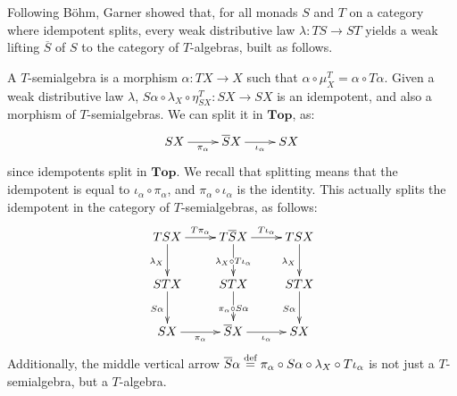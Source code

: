 \documentclass[preprint,12pt]{elsarticle}
\newcommand\eqdef{\mathrel{\buildrel \text{def}\over=}}
\newcommand{\creal}{\overline{\mathbb{R}}_+}
\newcommand\Pred{\mathbb{P}}
\newcommand\Demon{{\mathtt{D}}}
\newcommand\Nature{{\mathtt{P}}}
\newcommand\DN{{\Demon\Nature}}
\newcommand\Smyth{{\mathcal Q}}
\newcommand\Vt{\mathsf{V}}
\newcommand\SV{\Smyth_{\Vt}}
\newcommand\Val{{\mathbf V}}
\newcommand\Topcat{\mathbf{Top}}
\newtheorem{remark}[theorem]{Remark}
\begin{document}

Following B\"ohm, Garner showed that, for all monads $S$ and $T$ on a
category where idempotent splits, every weak distributive law
$\lambda \colon TS \to ST$ yields a weak lifting $\overline S$ of $S$
to the category of $T$-algebras, built as follows.

A $T$-semialgebra is a morphism $\alpha \colon TX \to X$ such that
$\alpha \circ \mu^T_X = \alpha \circ T \alpha$.  Given a weak
distributive law $\lambda$,
$S \alpha \circ \lambda_X \circ \eta^T_{SX} \colon SX \to SX$ is an
idempotent, and also a morphism of $T$-semialgebras.  We can split it
in $\Topcat$, as:
\[
  \xymatrix{
    SX \ar[r]_{\pi_\alpha}
    & \overline S X \ar[r]_{\iota_\alpha}
    & SX
  }
\]
since idempotents split in $\Topcat$.  We recall that splitting means
that the idempotent is equal to $\iota_\alpha \circ \pi_\alpha$, and
$\pi_\alpha \circ \iota_\alpha$ is the identity.  This actually splits
the idempotent in the category of $T$-semialgebras, as follows:
\[
  \xymatrix{
    TSX
    \ar[d]_{\lambda_X}
    \ar[r]^{T \pi_\alpha}
    & T\overline S X
    \ar[r]^{T \iota_\alpha}
    \ar[d]|{\lambda_X \circ T \iota_\alpha}
    & TSX
    \ar[d]_{\lambda_X}
    \\
    STX
    \ar[d]_{S \alpha}
    &
    STX
    \ar[d]|{\pi_\alpha \circ S\alpha}
    &
    STX
    \ar[d]_{S \alpha}
    \\
    SX \ar[r]_{\pi_\alpha}
    & \overline S X \ar[r]_{\iota_\alpha}
    & SX
  }
\]
Additionally, the middle vertical arrow $\overline S \alpha \eqdef
\pi_\alpha \circ S\alpha \circ \lambda_X \circ T\iota_\alpha$ is not
just a $T$-semialgebra, but a $T$-algebra.
\end{document}
